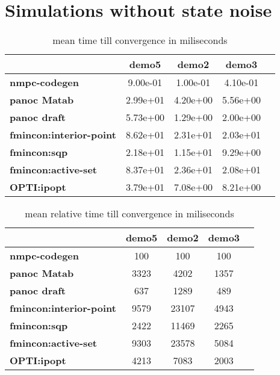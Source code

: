 \section{Simulations without state noise}
\begin{table}[H]
	\centering
	\begin{tabular}{|l|c|c|c|c|}
		\hline
		&\textbf{demo5}&\textbf{demo2}&\textbf{demo3}\\\hline
		\textbf{nmpc-codegen}&9.00e-01&1.00e-01&4.10e-01\\\hline
		\textbf{panoc Matab}&2.99e+01&4.20e+00&5.56e+00\\\hline
		\textbf{panoc draft}&5.73e+00&1.29e+00&2.00e+00\\\hline
		\textbf{fmincon:interior-point}&8.62e+01&2.31e+01&2.03e+01\\\hline
		\textbf{fmincon:sqp}&2.18e+01&1.15e+01&9.29e+00\\\hline
		\textbf{fmincon:active-set}&8.37e+01&2.36e+01&2.08e+01\\\hline
		\textbf{OPTI:ipopt}&3.79e+01&7.08e+00&8.21e+00\\\hline
	\end{tabular}
	\caption{mean time till convergence in miliseconds}
	\label{tbl:mean time till convergence}
\end{table}

\begin{table}[H]
	\centering
	\begin{tabular}{|l|c|c|c|c|}
		\hline
		&\textbf{demo5}&\textbf{demo2}&\textbf{demo3}\\\hline
		\textbf{nmpc-codegen}&100&100&100\\\hline
		\textbf{panoc Matab}&3323&4202&1357\\\hline
		\textbf{panoc draft}&637&1289&489\\\hline
		\textbf{fmincon:interior-point}&9579&23107&4943\\\hline
		\textbf{fmincon:sqp}&2422&11469&2265\\\hline
		\textbf{fmincon:active-set}&9303&23578&5084\\\hline
		\textbf{OPTI:ipopt}&4213&7083&2003\\\hline
	\end{tabular}
	\caption{mean relative time till convergence in miliseconds}
	\label{tbl:mean relative time till convergence}
\end{table}

